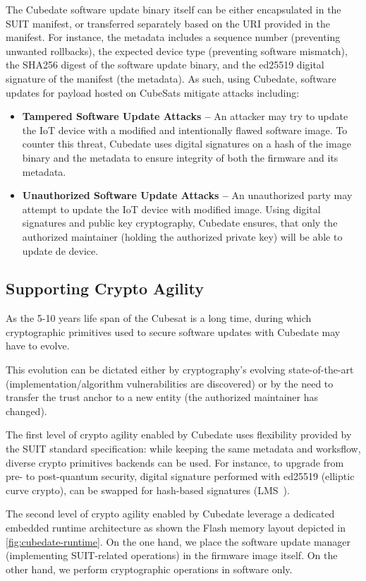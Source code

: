 The Cubedate software update binary itself can be either encapsulated in the SUIT manifest, or transferred separately based on the URI provided in the manifest.
For instance, the metadata includes a sequence number (preventing unwanted rollbacks), the expected device type (preventing software mismatch), the SHA256 digest of the software update binary, and the ed25519 digital signature of the manifest (the metadata).
As such, using Cubedate, software updates for payload hosted on CubeSats mitigate attacks including:

\begin{itemize}
\item {\bf Tampered Software Update Attacks –} An attacker may try to update the IoT device with a modified and intentionally flawed software image. To counter this threat, Cubedate uses digital signatures on a hash of the image binary and the metadata to ensure integrity of both the firmware and its metadata.

\item {\bf Unauthorized Software Update Attacks –} An unauthorized party may attempt to update the IoT device with modified image. Using digital signatures and public key cryptography, Cubedate ensures, that only the authorized maintainer (holding the authorized private key) will be able to update de device.
\end{itemize}

\subsection{Supporting Crypto Agility}
As the 5-10 years life span of the Cubesat is a long time, during which cryptographic primitives used to secure software updates with Cubedate may have to evolve.

This evolution can be dictated either by cryptography's evolving state-of-the-art (implementation/algorithm vulnerabilities are discovered) or by the need to transfer the trust anchor to a new entity (the authorized maintainer has changed).

The first level of crypto agility enabled by Cubedate uses flexibility provided by the SUIT standard specification: while keeping the same metadata and worksflow, diverse crypto primitives backends can be used. For instance, to upgrade from pre- to post-quantum security, digital signature performed with ed25519 (elliptic curve crypto), can be swapped for hash-based signatures (LMS~\cite{banegas2022quantum-suit}).

The second level of crypto agility enabled by Cubedate leverage a dedicated embedded runtime architecture as shown the Flash memory layout depicted in \autoref{fig:cubedate-runtime}. On the one hand, we place the software update manager (implementing SUIT-related operations) in the firmware image itself. On the other hand, we perform cryptographic operations in software only.

